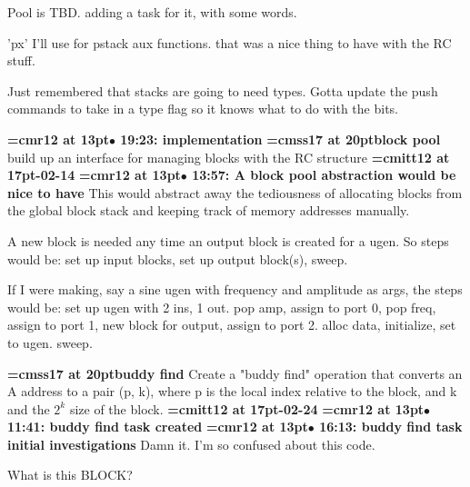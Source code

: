 Pool is TBD. adding a task for it, with some words.
\par

'px' I'll use for pstack aux functions. that was a nice thing to have with the RC stuff.
\par

Just remembered that stacks are going to need types. Gotta update the push commands to take in a type flag so it knows what to do with the bits.
\par

{\smallskip\noindent\bf\font\titlefont=cmr12 at 13pt\titlefont $\bullet$ 19:23: implementation}\smallskip
{}
{\medskip\noindent\bf\font\titlefont=cmss17 at 20pt\titlefont block pool}\medskip
build up an interface for managing blocks with the RC structure
{\medskip\noindent\bf\font\titlefont=cmitt12 at 17pt-02-14}\medskip
{\smallskip\noindent\bf\font\titlefont=cmr12 at 13pt\titlefont $\bullet$ 13:57: A block pool abstraction would be nice to have}\smallskip
This would abstract away the tediousness of allocating blocks from the global block stack and keeping track of memory addresses manually.
\par

A new block is needed any time an output block is created for a ugen. So steps would be: set up input blocks, set up output block(s), sweep.
\par

If I were making, say a sine ugen with frequency and amplitude as args, the steps would be: set up ugen with 2 ins, 1 out. pop amp, assign to port 0, pop freq, assign to port 1, new block for output, assign to port 2. alloc data, initialize, set to ugen. sweep.
\par

{\medskip\noindent\bf\font\titlefont=cmss17 at 20pt\titlefont buddy find}\medskip
Create a "buddy find" operation that converts an A
address to a pair (p, k), where p is the local index
relative to the block, and k and the $2^k$ size of the block.
{\medskip\noindent\bf\font\titlefont=cmitt12 at 17pt-02-24}\medskip
{\smallskip\noindent\bf\font\titlefont=cmr12 at 13pt\titlefont $\bullet$ 11:41: buddy find task created}\smallskip
{\smallskip\noindent\bf\font\titlefont=cmr12 at 13pt\titlefont $\bullet$ 16:13: buddy find task initial investigations}\smallskip
Damn it. I'm so confused about this code.
\par

What is this BLOCK?
\par

